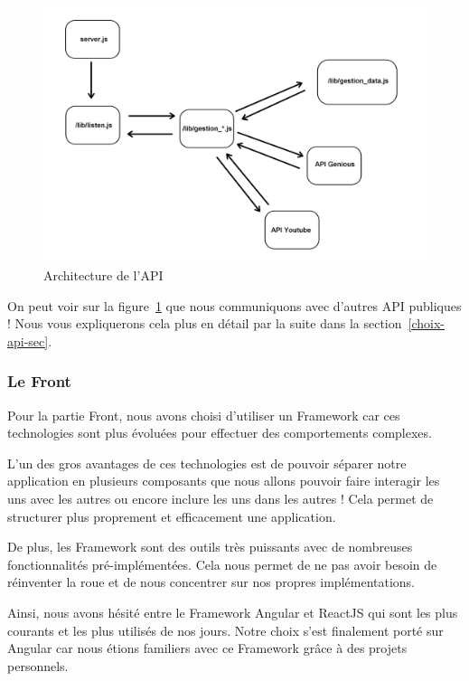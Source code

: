 \documentclass[12pt,french]{article}
\begin{document}
\begin{figure}[H]
	\centering
	\includegraphics[scale=0.16]{api.png}
	\caption{Architecture de l'API}
	\label{figure4} 
\end{figure}

\medskip

On peut voir sur la figure~\ref{figure4} que nous communiquons avec d'autres \gls{API} publiques ! Nous vous expliquerons cela plus en détail par la suite dans la section~\ref{choix-api-sec}.

\subsubsection{Le Front}

Pour la partie \gls{Front}, nous avons choisi d'utiliser un \gls{Framework} car ces technologies sont plus évoluées pour effectuer des comportements complexes.

\medskip

L'un des gros avantages de ces technologies est de pouvoir séparer notre application en plusieurs composants que nous allons pouvoir faire interagir les uns avec les autres ou encore inclure les uns dans les autres ! Cela permet de structurer plus proprement et efficacement une application.

\medskip

De plus, les \gls{Framework} sont des outils très puissants avec de nombreuses fonctionnalités pré-implémentées. Cela nous permet de ne pas avoir besoin de réinventer la roue et de nous concentrer sur nos propres implémentations.

\medskip

Ainsi, nous avons hésité entre le \gls{Framework} Angular et ReactJS qui sont les plus courants et les plus utilisés de nos jours. Notre choix s'est finalement porté sur Angular car nous étions familiers avec ce \gls{Framework} grâce à des projets personnels. 
\end{document}
